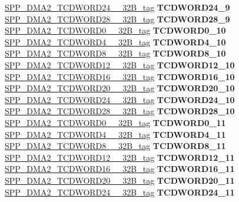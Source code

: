 \begin{DoxyCompactItemize}
\begin{tabbing}
\>\>\mbox{\hyperlink{unionSPP__DMA2__TCDWORD24____32B__tag}{SPP\_DMA2\_TCDWORD24\_\_32B\_tag}} {\bfseries TCDWORD24\_9}\\
\>\>\mbox{\hyperlink{unionSPP__DMA2__TCDWORD28____32B__tag}{SPP\_DMA2\_TCDWORD28\_\_32B\_tag}} {\bfseries TCDWORD28\_9}\\
\>\>\mbox{\hyperlink{unionSPP__DMA2__TCDWORD0____32B__tag}{SPP\_DMA2\_TCDWORD0\_\_32B\_tag}} {\bfseries TCDWORD0\_10}\\
\>\>\mbox{\hyperlink{unionSPP__DMA2__TCDWORD4____32B__tag}{SPP\_DMA2\_TCDWORD4\_\_32B\_tag}} {\bfseries TCDWORD4\_10}\\
\>\>\mbox{\hyperlink{unionSPP__DMA2__TCDWORD8____32B__tag}{SPP\_DMA2\_TCDWORD8\_\_32B\_tag}} {\bfseries TCDWORD8\_10}\\
\>\>\mbox{\hyperlink{unionSPP__DMA2__TCDWORD12____32B__tag}{SPP\_DMA2\_TCDWORD12\_\_32B\_tag}} {\bfseries TCDWORD12\_10}\\
\>\>\mbox{\hyperlink{unionSPP__DMA2__TCDWORD16____32B__tag}{SPP\_DMA2\_TCDWORD16\_\_32B\_tag}} {\bfseries TCDWORD16\_10}\\
\>\>\mbox{\hyperlink{unionSPP__DMA2__TCDWORD20____32B__tag}{SPP\_DMA2\_TCDWORD20\_\_32B\_tag}} {\bfseries TCDWORD20\_10}\\
\>\>\mbox{\hyperlink{unionSPP__DMA2__TCDWORD24____32B__tag}{SPP\_DMA2\_TCDWORD24\_\_32B\_tag}} {\bfseries TCDWORD24\_10}\\
\>\>\mbox{\hyperlink{unionSPP__DMA2__TCDWORD28____32B__tag}{SPP\_DMA2\_TCDWORD28\_\_32B\_tag}} {\bfseries TCDWORD28\_10}\\
\>\>\mbox{\hyperlink{unionSPP__DMA2__TCDWORD0____32B__tag}{SPP\_DMA2\_TCDWORD0\_\_32B\_tag}} {\bfseries TCDWORD0\_11}\\
\>\>\mbox{\hyperlink{unionSPP__DMA2__TCDWORD4____32B__tag}{SPP\_DMA2\_TCDWORD4\_\_32B\_tag}} {\bfseries TCDWORD4\_11}\\
\>\>\mbox{\hyperlink{unionSPP__DMA2__TCDWORD8____32B__tag}{SPP\_DMA2\_TCDWORD8\_\_32B\_tag}} {\bfseries TCDWORD8\_11}\\
\>\>\mbox{\hyperlink{unionSPP__DMA2__TCDWORD12____32B__tag}{SPP\_DMA2\_TCDWORD12\_\_32B\_tag}} {\bfseries TCDWORD12\_11}\\
\>\>\mbox{\hyperlink{unionSPP__DMA2__TCDWORD16____32B__tag}{SPP\_DMA2\_TCDWORD16\_\_32B\_tag}} {\bfseries TCDWORD16\_11}\\
\>\>\mbox{\hyperlink{unionSPP__DMA2__TCDWORD20____32B__tag}{SPP\_DMA2\_TCDWORD20\_\_32B\_tag}} {\bfseries TCDWORD20\_11}\\
\>\>\mbox{\hyperlink{unionSPP__DMA2__TCDWORD24____32B__tag}{SPP\_DMA2\_TCDWORD24\_\_32B\_tag}} {\bfseries TCDWORD24\_11}\\

\end{tabbing}
\end{DoxyCompactItemize}
